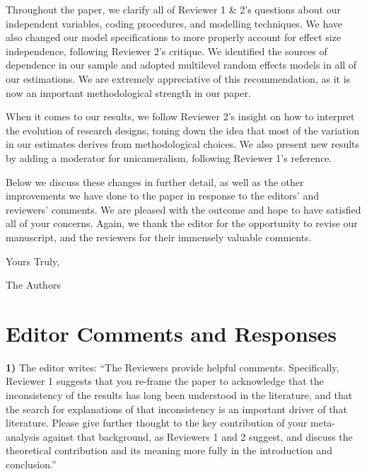 \documentclass[a4paper,12pt]{article}
\begin{document}
Throughout the paper, we clarify all of Reviewer 1 \& 2's questions about our independent variables, coding procedures, and modelling techniques. We have also changed our model specifications to more properly account for effect size independence, following Reviewer 2's critique. We identified the sources of dependence in our sample and adopted multilevel random effects models in all of our estimations. We are extremely appreciative of this recommendation, as it is now an important methodological strength in our paper.

When it comes to our results, we follow Reviewer 2's insight on how to interpret the evolution of research designs, toning down the idea that most of the variation in our estimates derives from methodological choices. We also present new results by adding a moderator for unicameralism, following Reviewer 1's reference. 

Below we discuss these changes in further detail, as well as the other
improvements we have done to the paper in response to the editors' and
reviewers' comments. We are pleased with the outcome and hope to have satisfied
all of your concerns. Again, we thank the editor for the opportunity to revise
our manuscript, and the reviewers for their immensely valuable comments.

\vspace{.5cm}

\noindent Yours Truly, 

\vspace{.5cm}

\noindent The Authors

\section*{Editor Comments and Responses}

\textbf{1)} The editor writes: ``The Reviewers provide helpful comments. Specifically, Reviewer 1 suggests that you re-frame the paper to acknowledge that the inconsistency of the results has long been understood in the literature, and that the search for explanations of that inconsistency is an important driver of that literature. Please give further thought to the key contribution of your meta-analysis against that background, as Reviewers 1 and 2 suggest, and discuss the theoretical contribution and its meaning more fully in the introduction and conclusion.''

\vspace{.3cm}
\end{document}
